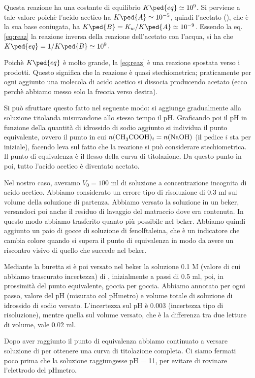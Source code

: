 Questa reazione ha una costante di equilibrio $K\ped{eq} \simeq 10^9$. Si perviene a tale valore poichè l'acido acetico ha $K\ped{A} \simeq 10^{-5}$,
quindi l'acetato (), che è la sua base coniugata, ha $K\ped{B} = K_w / K\ped{A} \simeq 10^{-9}$.
Essendo la eq. \eqref{eq:reaz} la reazione
inversa della reazione dell'acetato con l'acqua, si ha che $K\ped{eq} = 1/K\ped{B} \simeq 10^9$.

Poichè $K\ped{eq}$ è molto grande, la \eqref{eq:reaz} è una reazione spostata verso i prodotti. Questo significa che la reazione
è quasi stechiometrica; praticamente per ogni  aggiunto una molecola di acido acetico si dissocia producendo acetato
(ecco perchè abbiamo messo solo la freccia verso destra).

Si può sfruttare questo fatto nel seguente modo: si aggiunge gradualmente  alla soluzione titolanda misurandone allo
stesso tempo il pH. Graficando poi il pH in funzione della quantità di idrossido di sodio aggiunto si individua
il punto equivalente, ovvero il punto in cui $n(\ce{CH3COOH})_i = n(\ce{NaOH})$ (il pedice $i$ sta per iniziale),
facendo leva sul fatto che la reazione si può considerare stechiometrica. Il punto di equivalenza è
il flesso della curva di titolazione. Da questo punto in poi, tutto l'acido acetico è diventato acetato.

Nel nostro caso, avevamo $V_0 = 100$ ml di soluzione a concentrazione incognita di acido acetico. Abbiamo
considerato un errore tipo di risoluzione di 0.3 ml sul volume della soluzione di partenza. Abbiamo versato la soluzione in un
beker, versandoci poi anche il residuo di lavaggio del matraccio dove era contenuta. In questo modo abbiamo
trasferito quanto più  possibile nel beker. Abbiamo quindi aggiunto un paio di gocce
di soluzione di fenolftaleina, che è un indicatore che cambia colore quando si supera il punto di equivalenza
in modo da avere un riscontro visivo di quello che succede nel beker.

Mediante la buretta si è poi versato nel beker la soluzione 0.1 M (valore di cui abbiamo trascurato incertezza)
di , inizialmente a
passi di 0.5 ml, poi, in prossimità del punto equivalente, goccia per goccia. Abbiamo annotato per ogni passo, valore
del pH (misurato col pHmetro) e volume totale di soluzione di idrossido di sodio versato. L'incertezza sul pH è 0.003
(incertezza tipo di risoluzione), mentre quella sul volume versato, che è la differenza tra due letture di volume,
vale 0.02 ml. 

Dopo aver raggiunto il punto di equivalenza abbiamo continuato a versare soluzione di  per
ottenere una curva di titolazione completa. Ci siamo fermati poco prima che la soluzione raggiungesse pH = 11,
per evitare di rovinare l'elettrodo del pHmetro.
